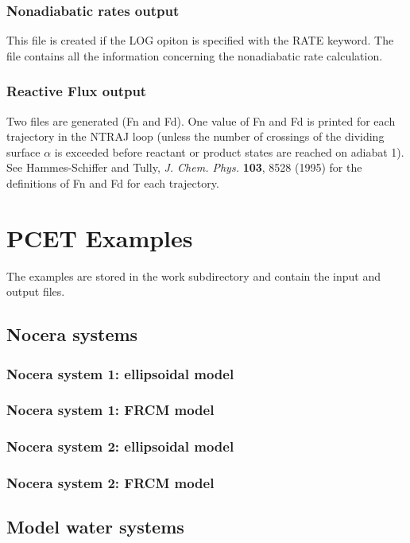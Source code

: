\documentclass[oneside,11pt,openany]{book}
\newcommand{\tw}{\ttfamily}
\begin{document}
\subsection{Nonadiabatic rates output}
This file is created if the {\tw LOG} opiton is specified
with the {\tw RATE} keyword. The file contains all the information
concerning the nonadiabatic rate calculation.

\subsection{Reactive Flux output}
Two files are generated (Fn and Fd).  One value of Fn and Fd is printed for each 
trajectory in the NTRAJ loop (unless the number of crossings of the dividing surface $\alpha$ is 
exceeded before reactant or product states are reached on adiabat 1). 
 See Hammes-Schiffer and Tully, \textit{J. Chem. Phys.} \textbf{103}, 8528 (1995)
for the definitions of Fn and Fd for each trajectory.  


\chapter{PCET Examples}
The examples are stored in the {\tw work} subdirectory
and contain the input and output files.
%
\section{Nocera systems}
%
\subsection{Nocera system 1: ellipsoidal model}

%
\subsection{Nocera system 1: FRCM model}

%
\subsection{Nocera system 2: ellipsoidal model}

%
\subsection{Nocera system 2: FRCM model}

%
\section{Model water systems}
%
\end{document}

